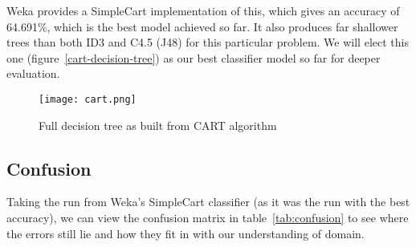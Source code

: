 \documentclass[11pt,a4paper]{article}
\begin{document}
Weka provides a SimpleCart
implementation of this, which gives an accuracy of 64.691\%, which is the best
model achieved so far. It also produces far shallower trees than both ID3
and C4.5 (J48) for this particular problem. We will elect this one
(figure~\ref{cart-decision-tree}) as our best
classifier model so far for deeper evaluation.

\begin{sidewaysfigure}
  \centering
  \texttt{[image: cart.png]}
  \caption{Full decision tree as built from CART algorithm}
  \label{fig:cart-decision-tree}
\end{sidewaysfigure}

\subsection{Confusion}

Taking the run from Weka's SimpleCart classifier (as it was the run with the 
best accuracy), we can view the confusion matrix in table~\ref{tab:confusion}
to see where the errors still lie and how they fit in with our understanding of domain.
\end{document}
